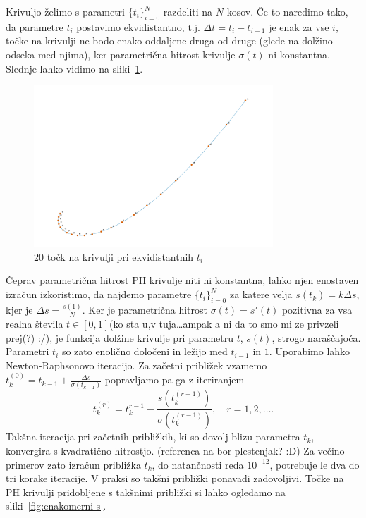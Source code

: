 \documentclass[isrm2, tisk]{fmfdelo}
\begin{document}
    Krivuljo želimo s parametri $\{t_i\}_{i=0}^{N}$ razdeliti na $N$ kosov.
    Če to naredimo tako, da parametre $t_i$ postavimo ekvidistantno, t.j. $\Delta t=t_i-t_{i-1}$ je enak za vse $i$, točke na krivulji ne bodo enako oddaljene druga od druge (glede na dolžino odseka med njima), ker parametrična hitrost krivulje $\sigma(t)$ ni konstantna.
    Slednje lahko vidimo na sliki~\ref{fig:enakomerni-t}.
    \begin{figure}[h]
        \centering
        \includegraphics[width = 0.80\textwidth]{images/enakomerni-t}
        \caption{20 točk na krivulji pri ekvidistantnih $t_i$}
        \label{fig:enakomerni-t}
    \end{figure}
    Čeprav parametrična hitrost PH krivulje niti ni konstantna, lahko njen enostaven izračun izkoristimo, da najdemo parametre $\{t_i\}^{N}_{i=0}$  za katere velja $s(t_k)=k\Delta s$, kjer je $\Delta s = \frac{s(1)}{N}$.
    Ker je parametrična hitrost $\sigma(t)=s'(t)$ pozitivna za vsa realna števila $t\in[0,1]$(ko sta u,v tuja\ldots ampak a ni da to smo mi ze privzeli prej(?) :/),
    je funkcija dolžine krivulje pri parametru $t$, $s(t)$, strogo naraščajoča.
    Parametri $t_i$ so zato enolično določeni in ležijo med $t_{i-1}$ in $1$.
    Uporabimo lahko Newton-Raphsonovo iteracijo.
    Za začetni približek vzamemo $t_k^{(0)} = t_{k-1} + \frac{\Delta s}{\sigma(t_{k-1})}$ popravljamo pa ga z iteriranjem
    \[ t_k^{(r)} = t_k^{r-1} - \frac{s(t_k^{(r-1)})}{\sigma(t_k^{(r-1)})}, \quad r=1,2,\ldots .\]
    Takšna iteracija pri začetnih približkih, ki so dovolj blizu parametra $t_k$, konvergira s kvadratično hitrostjo. (referenca na bor plestenjak? :D)
    Za večino primerov zato izračun približka $t_k$, do natančnosti reda $10^{-12}$, potrebuje le dva do tri korake iteracije.
    V praksi so takšni približki ponavadi zadovoljivi.
    Točke na PH krivulji pridobljene s takšnimi približki si lahko ogledamo na sliki~\ref{fig:enakomerni-s}.
\end{document}
